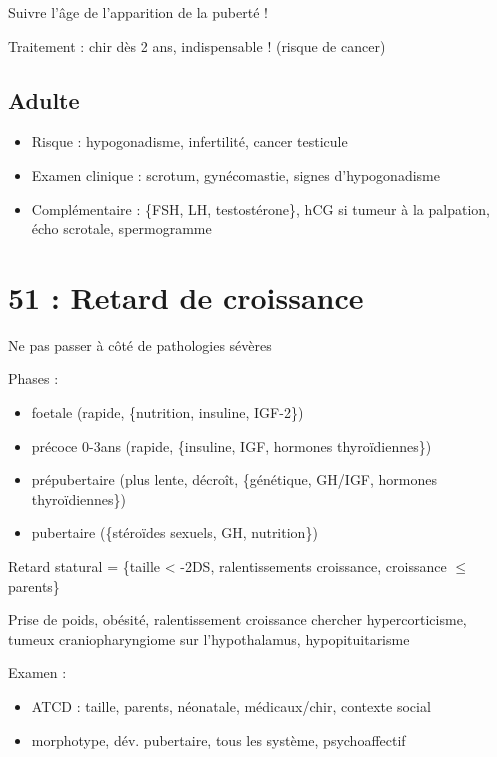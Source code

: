 \documentclass[11pt]{article}
\begin{document}
Suivre l'âge de l'apparition de la puberté !

Traitement : chir dès 2 ans, indispensable ! (risque de cancer)
\subsection{Adulte}
\label{sec:org489fe1f}
\begin{itemize}
\item Risque : hypogonadisme, infertilité, cancer testicule
\item Examen clinique : scrotum, gynécomastie, signes d'hypogonadisme
\item Complémentaire : \{FSH, LH, testostérone\}, hCG si tumeur à la palpation, écho
scrotale, spermogramme
\end{itemize}
\section{51 : Retard de croissance}
\label{sec:orgc0e2227}
\danger Ne pas passer à côté de pathologies sévères

Phases : 
\begin{itemize}
\item foetale (rapide, \{nutrition, insuline, IGF-2\})
\item précoce 0-3ans (rapide, \{insuline, IGF, hormones thyroïdiennes\})
\item prépubertaire (plus lente, décroît, \{génétique, GH/IGF, hormones thyroïdiennes\})
\item pubertaire (\{stéroïdes sexuels, GH, nutrition\})
\end{itemize}

Retard statural = \{taille < -2DS, ralentissements croissance, croissance \(\le\) parents\}

Prise de poids, obésité, ralentissement croissance \thus chercher
hypercorticisme, tumeux craniopharyngiome sur l'hypothalamus, hypopituitarisme

Examen :
\begin{itemize}
\item ATCD : taille, parents, néonatale, médicaux/chir, contexte social
\item morphotype, dév. pubertaire, tous les système, psychoaffectif
\end{itemize}
\end{document}
